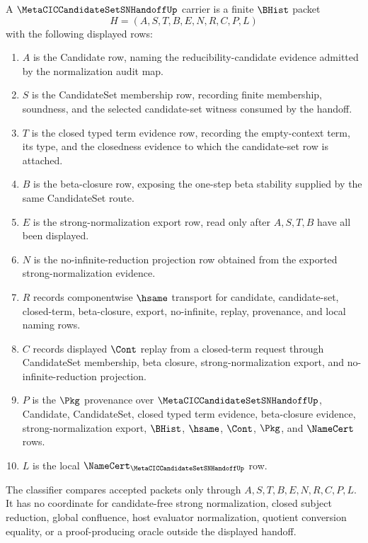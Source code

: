 \begin{definition}
\label{def:metacic-candidate-set-sn-handoff-carrier}
A $\MetaCICCandidateSetSNHandoffUp$ carrier is a finite $\BHist$ packet
$$
H=(A,S,T,B,E,N,R,C,P,L)
$$
with the following displayed rows:
\begin{enumerate}
\item $A$ is the Candidate row, naming the reducibility-candidate evidence admitted by the normalization audit map.
\item $S$ is the CandidateSet membership row, recording finite membership, soundness, and the selected candidate-set witness consumed by the handoff.
\item $T$ is the closed typed term evidence row, recording the empty-context term, its type, and the closedness evidence to which the candidate-set row is attached.
\item $B$ is the beta-closure row, exposing the one-step beta stability supplied by the same CandidateSet route.
\item $E$ is the strong-normalization export row, read only after $A,S,T,B$ have all been displayed.
\item $N$ is the no-infinite-reduction projection row obtained from the exported strong-normalization evidence.
\item $R$ records componentwise $\hsame$ transport for candidate, candidate-set, closed-term, beta-closure, export, no-infinite, replay, provenance, and local naming rows.
\item $C$ records displayed $\Cont$ replay from a closed-term request through CandidateSet membership, beta closure, strong-normalization export, and no-infinite-reduction projection.
\item $P$ is the $\Pkg$ provenance over $\MetaCICCandidateSetSNHandoffUp$, Candidate, CandidateSet, closed typed term evidence, beta-closure evidence, strong-normalization export, $\BHist$, $\hsame$, $\Cont$, $\Pkg$, and $\NameCert$ rows.
\item $L$ is the local $\NameCert_{\MetaCICCandidateSetSNHandoffUp}$ row.
\end{enumerate}
The classifier compares accepted packets only through $A,S,T,B,E,N,R,C,P,L$. It has no coordinate for candidate-free strong normalization, closed subject reduction, global confluence, host evaluator normalization, quotient conversion equality, or a proof-producing oracle outside the displayed handoff.
\end{definition}

